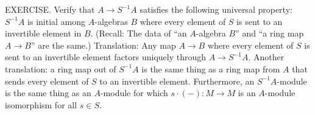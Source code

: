 EXERCISE. Verify that $A \to S^{-1}A$ satisfies the following universal property: $S^{-1}A$ is initial among $A$-algebras $B$ where every element of $S$ is sent to an invertible element in $B$. (Recall: The data of “an $A$-algebra $B$” and “a ring map $A \to B$” are the same.) Translation: Any map $A \to B$ where every element of $S$ is sent to an invertible element factors uniquely through $A \to S^{-1}A$. Another translation: a ring map out of $S^{-1}A$ is the same thing as a ring map from $A$ that sends every element of $S$ to an invertible element. Furthermore, an $S^{-1}A$-module is the same thing as an $A$-module for which $s \cdot (-) : M \to M$ is an $A$-module isomorphism for all $s \in S$.
